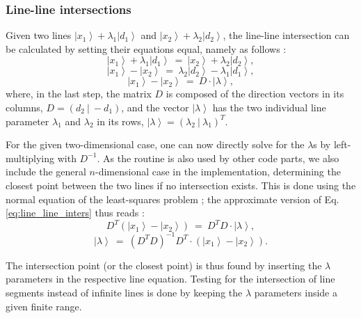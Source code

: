 \subsubsection*{Line-line intersections}
Given two lines $\left|x_1\right> + \lambda_1 \left|d_1\right>$ and $\left|x_2\right> + \lambda_2 \left|d_2\right>$, 
the line-line intersection can be calculated by setting their equations equal, namely as follows \cite{wiki_line_line_intersection}:
\begin{equation}
	\left|x_1\right> + \lambda_1 \left|d_1\right> \ =\ \left|x_2\right> + \lambda_2 \left|d_2\right>,
\end{equation}
\begin{equation}
	\left|x_1\right> - \left|x_2\right> \ =\  \lambda_2 \left|d_2\right> - \lambda_1 \left|d_1\right>,
\end{equation}
\begin{equation}
	\left|x_1\right> - \left|x_2\right> \ =\  D \cdot \left| \lambda \right>,
	\label{eq:line_line_inters}
\end{equation}
where, in the last step, the matrix $D$ is composed of the direction vectors in its columns, $D = \left( d_2 \ |\  -d_1 \right)$, 
and the vector $\left| \lambda \right>$ has the two individual line parameter $\lambda_1$ and $\lambda_2$ in its
rows, $\left| \lambda \right> = \left( \lambda_2 \ |\  \lambda_1 \right)^T$.

For the given two-dimensional case, one can now directly solve for the $\lambda$s by left-multiplying with $D^{-1}$.
As the routine is also used by other code parts, we also include the general $n$-dimensional case in the implementation, 
determining the closest point between the two lines if no intersection exists.
This is done using the normal equation of the least-squares problem \cite[p. 793]{Arens2015}; 
the approximate version of Eq. \ref{eq:line_line_inters} thus reads \cite{wiki_line_line_intersection}: 
\begin{equation}
	D^T \left(\left|x_1\right> - \left|x_2\right>\right) \ =\  D^T D \cdot \left| \lambda \right>,
\end{equation}
\begin{equation}
	\left| \lambda \right> \ =\  \left( D^T D \right)^{-1} D^T \cdot \left( \left|x_1\right> - \left|x_2\right> \right).
\end{equation}

The intersection point (or the closest point) is thus found by inserting the $\lambda$ parameters in the respective line equation. 
Testing for the intersection of line segments instead of infinite lines is done by keeping the $\lambda$ parameters inside a given 
finite range.

